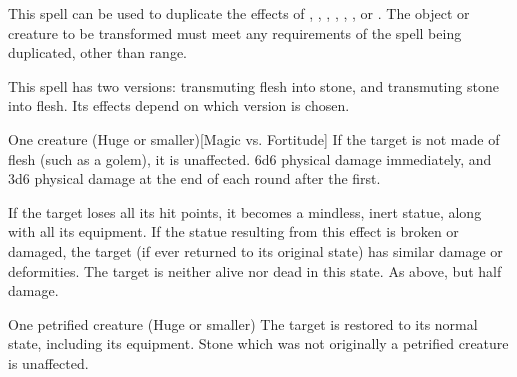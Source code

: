 \begin{spellheader}
    \spellrng{\rngmed}
\end{spellheader}
\begin{spelleffects}
    \spellspecial This spell can be used to duplicate the effects of , , , , , , or . The object or creature to be transformed must meet any requirements of the spell being duplicated, other than range.
\end{spelleffects}

\begin{spellheader}
    \spellrng{\rngmed}
\end{spellheader}
\begin{spelleffects}
    \spellspecial This spell has two versions: transmuting flesh into stone, and transmuting stone into flesh. Its effects depend on which version is chosen.
    \begin{spelltarget}{One creature (Huge or smaller)}[Magic vs. Fortitude]
        \spellspecial If the target is not made of flesh (such as a golem), it is unaffected.
        \spellsuccess 6d6 physical damage immediately, and 3d6 physical damage at the end of each round after the first.

        If the target loses all its hit points, it becomes a mindless, inert statue, along with all its equipment. If the statue resulting from this effect is broken or damaged, the target (if ever returned to its original state) has similar damage or deformities. The target is neither alive nor dead in this state.
        \spellfailure As above, but half damage.
    \end{spelltarget}

    \begin{spelltarget}{One petrified creature (Huge or smaller)}
        \spellsuccess The target is restored to its normal state, including its equipment. Stone which was not originally a petrified creature is unaffected.
    \end{spelltarget}
\end{spelleffects}

